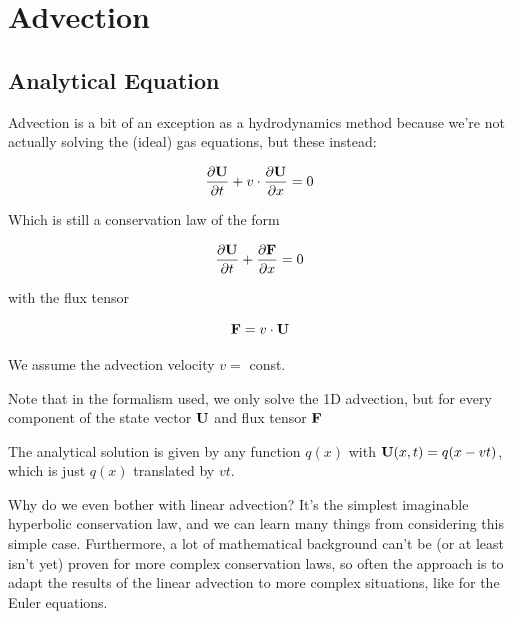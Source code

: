 \newpage
\section{Advection}\label{chap:advection}



\subsection{Analytical Equation}

Advection is a bit of an exception as a hydrodynamics method because we're not actually solving the (ideal) gas equations, but these instead:

\begin{equation}
	\frac{\partial  \mathbf{U} }{\partial t} + v \cdot \frac{\partial \mathbf{U}}{\partial x} = 0
\end{equation}


Which is still a conservation law of the form

\begin{equation}
	\frac{\partial  \mathbf{U} }{\partial t} + \frac{\partial \mathbf{F}}{\partial x} = 0
\end{equation}

with the flux tensor 

\begin{equation}
	\mathbf{F} = v \cdot \mathbf{U}
\end{equation}

We assume the advection velocity $v = $ const.

Note that in the formalism used, we only solve the 1D advection, but for every component of the state vector $\mathbf{U}$ and flux tensor $\mathbf{F}$

The analytical solution is given by any function $q(x)$ with $\mathbf{U}(x,t) = q(x - v t)$, which is just $q(x)$ translated by $v t$.


Why do we even bother with linear advection?
It's the simplest imaginable hyperbolic conservation law, and we can learn many things from considering this simple case.
Furthermore, a lot of mathematical background can't be (or at least isn't yet) proven for more complex conservation laws, so often the approach is to adapt the results of the linear advection to more complex situations, like for the Euler equations.







